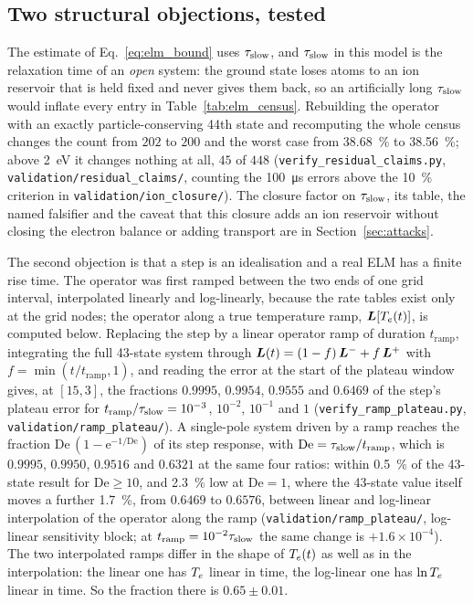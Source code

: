 \subsection{Two structural objections, tested}

The estimate of Eq.~\eqref{eq:elm_bound} uses $\tau_{\mathrm{slow}}$, and $\tau_{\mathrm{slow}}$ in
this model is the relaxation time of an \emph{open} system: the ground state
loses atoms to an ion reservoir that is held fixed and never gives them back,
so an artificially long $\tau_{\mathrm{slow}}$ would inflate every entry in
Table~\ref{tab:elm_census}. Rebuilding the operator with an exactly
particle-conserving 44th state and recomputing the whole census changes the
count from $202$ to $200$ and the worst case from \SI{38.68}{\percent} to
\SI{38.56}{\percent}; above \SI{2}{\electronvolt} it changes nothing at all,
$45$ of $448$ (\texttt{verify\_residual\_claims.py}, \texttt{validation/residual\_claims/}, counting the \SI{100}{\micro\second} errors above the \SI{10}{\percent} criterion in \texttt{validation/ion\_closure/}). The closure factor on $\tau_{\mathrm{slow}}$,
its table, the named falsifier and the caveat that this closure adds an ion
reservoir without closing the electron balance or adding transport are in
Section~\ref{sec:attacks}.

The second objection is that a step is an idealisation and a real ELM has a
finite rise time. The operator was first ramped between the two ends of one
grid interval, interpolated linearly and log-linearly, because the rate
tables exist only at the grid nodes; the operator along a true temperature
ramp, $\bm{L}[T_e(t)]$, is computed below.
Replacing the step by a linear operator ramp of duration
$t_{\mathrm{ramp}}$, integrating the full 43-state system through
$\bm{L}(t) = (1-f)\,\bm{L}^{-} + f\,\bm{L}^{+}$ with
$f = \min(t/t_{\mathrm{ramp}},1)$, and reading the error at the start of the
plateau window gives, at $[15,3]$, the fractions $0.9995$, $0.9954$, $0.9555$
and $0.6469$ of the step's plateau error for
$t_{\mathrm{ramp}}/\tau_{\mathrm{slow}} = 10^{-3}$, $10^{-2}$, $10^{-1}$ and $1$
(\texttt{verify\_ramp\_plateau.py}, \texttt{validation/ramp\_plateau/}). A
single-pole system driven by a ramp reaches the fraction
$\mathrm{De}\,(1-\mathrm{e}^{-1/\mathrm{De}})$ of its step response, with
$\mathrm{De} = \tau_{\mathrm{slow}}/t_{\mathrm{ramp}}$, which is $0.9995$, $0.9950$,
$0.9516$ and $0.6321$ at the same four ratios: within \SI{0.5}{\percent} of the
43-state result for $\mathrm{De}\ge10$, and \SI{2.3}{\percent} low at
$\mathrm{De}=1$, where the 43-state value itself moves a further
\SI{1.7}{\percent}, from $0.6469$ to $0.6576$, between linear and log-linear
interpolation of the operator along the ramp
(\texttt{validation/ramp\_plateau/}, log-linear sensitivity block; at
$t_{\mathrm{ramp}} = 10^{-2}\tau_{\mathrm{slow}}$ the same change is $+1.6\times10^{-4}$).
The two interpolated ramps differ in the shape of $T_e(t)$ as well as in the
interpolation: the linear one has $T_e$ linear in time, the log-linear one has
$\ln T_e$ linear in time. So the fraction there is $0.65\pm0.01$.

